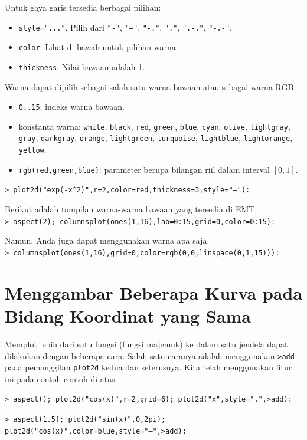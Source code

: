 \documentclass[11pt, a4paper]{article}
\newcommand{\emtcmd}[1]{\noindent\texttt{\textcolor{emtcommand}{>}\ #1}\par\smallskip}
\begin{document}
Untuk gaya garis tersedia berbagai pilihan:
\begin{itemize}
    \item \texttt{style="..."}. Pilih dari \texttt{"-"}, \texttt{"--"}, \texttt{"-."}, \texttt{"."}, \texttt{".-."}, \texttt{"-.-"}.
    \item \texttt{color}: Lihat di bawah untuk pilihan warna.
    \item \texttt{thickness}: Nilai bawaan adalah 1.
\end{itemize}

Warna dapat dipilih sebagai salah satu warna bawaan atau sebagai warna RGB:
\begin{itemize}
    \item \texttt{0..15}: indeks warna bawaan.
    \item konstanta warna: \texttt{white}, \texttt{black}, \texttt{red}, \texttt{green}, \texttt{blue}, \texttt{cyan}, \texttt{olive}, \texttt{lightgray}, \texttt{gray}, \texttt{darkgray}, \texttt{orange}, \texttt{lightgreen}, \texttt{turquoise}, \texttt{lightblue}, \texttt{lightorange}, \texttt{yellow}.
    \item \texttt{rgb(red,green,blue)}: parameter berupa bilangan riil dalam interval $[0,1]$.
\end{itemize}

\emtcmd{plot2d("exp(-x\^{}2)",r=2,color=red,thickness=3,style="--"):}

Berikut adalah tampilan warna-warna bawaan yang tersedia di EMT.
\emtcmd{aspect(2); columnsplot(ones(1,16),lab=0:15,grid=0,color=0:15):}

Namun, Anda juga dapat menggunakan warna apa saja.
\emtcmd{columnsplot(ones(1,16),grid=0,color=rgb(0,0,linspace(0,1,15))):}

\section*{Menggambar Beberapa Kurva pada Bidang Koordinat yang Sama}

Memplot lebih dari satu fungsi (fungsi majemuk) ke dalam satu jendela dapat dilakukan dengan beberapa cara. Salah satu caranya adalah menggunakan \texttt{>add} pada pemanggilan \texttt{plot2d} kedua dan seterusnya. Kita telah menggunakan fitur ini pada contoh-contoh di atas.

\emtcmd{aspect(); plot2d("cos(x)",r=2,grid=6); plot2d("x",style=".",>add):}
\emtcmd{aspect(1.5); plot2d("sin(x)",0,2pi); plot2d("cos(x)",color=blue,style="--",>add):}
\end{document}
